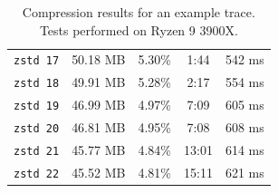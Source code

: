 \documentclass[hidelinks,titlepage,a4paper]{article}
\begin{document}
\begin{table}[h]
\begin{tabular}[h]{c|c|c|c|c}
\texttt{zstd 17} & 50.18 MB & 5.30\% & 1:44 & 542 \si{\milli\second} \\
\texttt{zstd 18} & 49.91 MB & 5.28\% & 2:17 & 554 \si{\milli\second} \\
\texttt{zstd 19} & 46.99 MB & 4.97\% & 7:09 & 605 \si{\milli\second} \\
\texttt{zstd 20} & 46.81 MB & 4.95\% & 7:08 & 608 \si{\milli\second} \\
\texttt{zstd 21} & 45.77 MB & 4.84\% & 13:01 & 614 \si{\milli\second} \\
\texttt{zstd 22} & 45.52 MB & 4.81\% & 15:11 & 621 \si{\milli\second}
\end{tabular}
\caption{Compression results for an example trace. \\ Tests performed on Ryzen 9 3900X.}
\label{compressiontimes}
\end{table}
\end{document}
